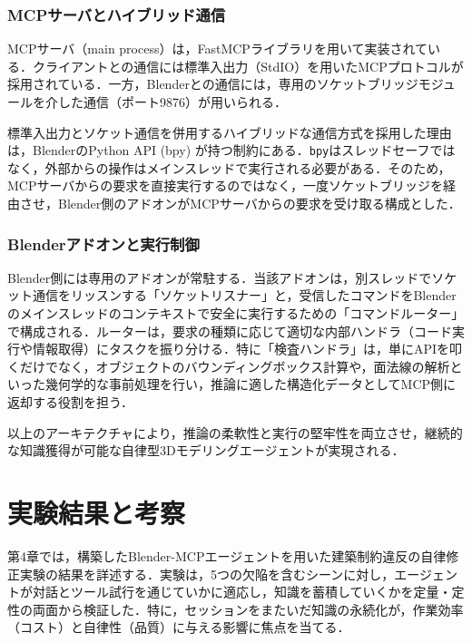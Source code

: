 \documentclass[dvipdfmx, a4paper, 9pt]{deimj}
\begin{document}
\subsubsection{MCPサーバとハイブリッド通信}

MCPサーバ（main process）は，FastMCPライブラリを用いて実装されている．クライアントとの通信には標準入出力（StdIO）を用いたMCPプロトコルが採用されている．一方，Blenderとの通信には，専用のソケットブリッジモジュールを介した通信（ポート9876）が用いられる．

標準入出力とソケット通信を併用するハイブリッドな通信方式を採用した理由は，BlenderのPython API (bpy) が持つ制約にある．\texttt{bpy}はスレッドセーフではなく，外部からの操作はメインスレッドで実行される必要がある．そのため，MCPサーバからの要求を直接実行するのではなく，一度ソケットブリッジを経由させ，Blender側のアドオンがMCPサーバからの要求を受け取る構成とした．

\subsubsection{Blenderアドオンと実行制御}

Blender側には専用のアドオンが常駐する．当該アドオンは，別スレッドでソケット通信をリッスンする「ソケットリスナー」と，受信したコマンドをBlenderのメインスレッドのコンテキストで安全に実行するための「コマンドルーター」で構成される．ルーターは，要求の種類に応じて適切な内部ハンドラ（コード実行や情報取得）にタスクを振り分ける．特に「検査ハンドラ」は，単にAPIを叩くだけでなく，オブジェクトのバウンディングボックス計算や，面法線の解析といった幾何学的な事前処理を行い，推論に適した構造化データとしてMCP側に返却する役割を担う．

以上のアーキテクチャにより，推論の柔軟性と実行の堅牢性を両立させ，継続的な知識獲得が可能な自律型3Dモデリングエージェントが実現される．

\section{実験結果と考察}

第4章では，構築したBlender-MCPエージェントを用いた建築制約違反の自律修正実験の結果を詳述する．実験は，5つの欠陥を含むシーンに対し，エージェントが対話とツール試行を通じていかに適応し，知識を蓄積していくかを定量・定性の両面から検証した．特に，セッションをまたいだ知識の永続化が，作業効率（コスト）と自律性（品質）に与える影響に焦点を当てる．
\end{document}
